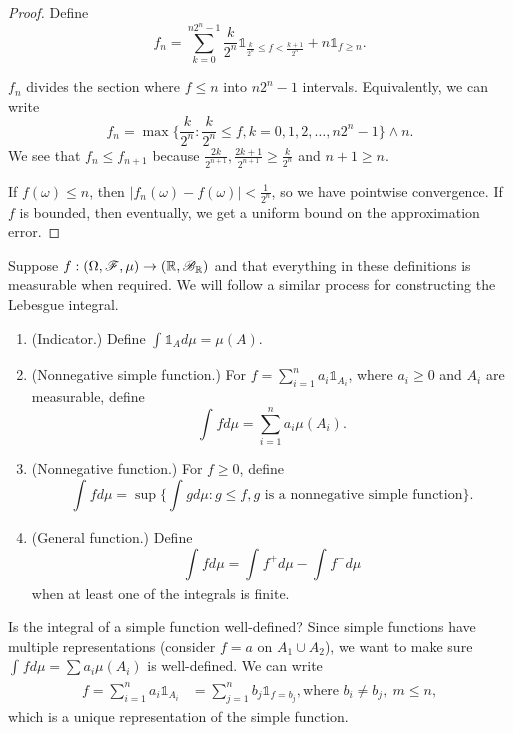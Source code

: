 \begin{proof}
	Define \[
		f_n = \sum\limits_{k=0}^{n2^n - 1} \frac{k}{2^{n}} \mathds{1}_{\frac{k}{2^n} \le f < \frac{k+1}{2^{n}}} + n \mathds{1}_{f \ge n}
	.\]

	$f_n$ divides the section where $f \le n$ into $n 2^n -1$ intervals. Equivalently, we can write \[
		f_n = \max \{\frac{k}{2^{n}}: \frac{k}{2^{n}} \le f, k = 0,1,2,\ldots, n 2^n - 1\} \wedge n
	.\] 
	We see that $f_n \le f_{n+1}$ because $\frac{2k}{2^{n+1}}, \frac{2k+1}{2^{n+1}} \ge \frac{k}{2^{n}}$ and $n+1 \ge n$.

	If $f(\omega) \le n$, then $\left| f_n(\omega) - f(\omega) \right| < \frac{1}{2^n}$, so we have pointwise convergence. If $f$ is bounded, then eventually, we get a uniform bound on the approximation error.
\end{proof}

\begin{remark}
	Suppose $f: \left( \Omega, \mathscr{F}, \mu \right) \to \left( \mathbb{R}, \mathscr{B}_{\mathbb{R}} \right)$ and that everything in these definitions is measurable when required. We will follow a similar process for constructing the Lebesgue integral.
	\begin{enumerate}[label=(\roman*)]
		\item (Indicator.) Define $\int_{}^{} \mathds{1}_{A}d\mu = \mu(A) $.
		\item (Nonnegative simple function.) For $f = \sum_{i=1}^{n}a_i \mathds{1}_{A_i}$, where $a_i \ge 0$ and $A_i$ are measurable, define \[
			\int_{}^{} fd\mu = \sum\limits_{i=1}^{n} a_i \mu\left( A_i \right) 
		.\] 
		\item (Nonnegative function.) For $f \ge 0$, define \[
			\int_{}^{} f d\mu = \sup \{\int_{}^{} gd\mu: g \le f, g \text{ is a nonnegative simple function} \} 
		.\] 
		\item (General function.) Define \[
			\int_{}^{} fd\mu = \int_{}^{} f^+ d\mu - \int_{}^{} f^- d\mu   
		\] when at least one of the integrals is finite.
	\end{enumerate}
\end{remark}

Is the integral of a simple function well-defined? Since simple functions have multiple representations (consider $f = a$ on $A_1 \cup A_2$),  we want to make sure $\int_{}^{} fd\mu = \sum a_i \mu(A_i) $ is well-defined. 
We can write
\begin{align*}
	f= \sum_{i=1}^{n}a_i \mathds{1}_{A_i} &= \sum_{j=1}^{n} b_j \mathds{1}_{f=b_j}, \text{where } b_i \ne b_j,\ m \le n
,\end{align*}
which is a unique representation of the simple function.

